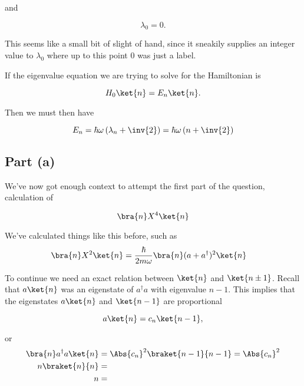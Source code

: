 and 

\begin{equation}\label{eqn:phy456ps1:260}
\lambda_0 = 0.
\end{equation}

This seems like a small bit of slight of hand, since it sneakily supplies an integer value to $\lambda_0$ where up to this point $0$ was just a label.

If the eigenvalue equation we are trying to solve for the Hamiltonian is

\begin{equation}\label{eqn:phy456ps1:280}
H_0 \ket{n} = E_n \ket{n}.
\end{equation}

Then we must then have

\begin{equation}\label{eqn:phy456ps1:300}
E_n = \hbar \omega \left(\lambda_n + \inv{2} \right) = \hbar \omega \left(n + \inv{2} \right) 
\end{equation}

\subsection{Part (a)}

We've now got enough context to attempt the first part of the question, calculation of

\begin{equation}\label{eqn:phy456ps1:320}
\bra{n} X^4 \ket{n}
\end{equation}

We've calculated things like this before, such as
\begin{align*}
\bra{n} X^2 \ket{n}
&=
\frac{\hbar}{2 m \omega} \bra{n} (a + a^\dagger)^2 \ket{n}
\end{align*}

To continue we need an exact relation between $\ket{n}$ and $\ket{n \pm 1}$.  Recall that $a \ket{n}$ was an eigenstate of $a^\dagger a$ with eigenvalue $n - 1$.  This implies that the eigenstates $a \ket{n}$ and $\ket{n-1}$ are proportional

\begin{equation}\label{eqn:phy456ps1:340}
a \ket{n} = c_n \ket{n - 1},
\end{equation}

or
\begin{align*}
\bra{n} a^\dagger a \ket{n} &= \Abs{c_n}^2 \braket{n - 1}{n-1} = \Abs{c_n}^2 \\
n \braket{n}{n} &= \\
n &=
\end{align*}

